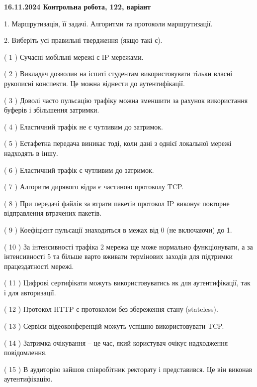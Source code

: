 \documentclass[12pt, ukrainian]{article}
\begin{document}
\vspace{4mm}
\newpage
\begin {large}

\textbf{16.11.2024 Контрольна робота, 122, варіант  }\par


{
1. Маршрутизація, її задачі. Алгоритми та протоколи маршрутизації.



\vspace{5mm}
2. Виберіть усі правильні твердження (якщо такі є).\par
\vspace{2mm}

( 1 ) Сучасні мобільні мережі є IP-мережами.

( 2 ) Викладач дозволив на іспиті студентам використовувати тільки власні рукописні конспекти. Це можна віднести до аутентифікації.

( 3 ) Доволі часто пульсацію трафіку можна зменшити за рахунок використання буферів і збільшення затримки.

( 4 ) Еластичний трафік не є чутливим до затримок.

( 5 ) Естафетна передача виникає тоді, коли дані з однієї локальної мережі надходять в іншу.

( 6 ) Еластичний трафік є чутливим до затримок.

( 7 ) Алгоритм дирявого відра є частиною протоколу TCP.

( 8 ) При передачі файлів за втрати пакетів протокол IP виконує повторне відправлення втрачених пакетів.

( 9 ) Коефіцієнт пульсації знаходиться в межах від 0 (не включаючи) до 1.

( 10 ) За інтенсивності трафіка 2 мережа ще може нормально функціонувати, а за інтенсивності 5 та більше варто вживати термінових заходів для підтримки працездатності мережі.

( 11 ) Цифрові сертифікати можуть використовуватись як для аутентифікації, так і для авторизації.

( 12 ) Протокол  HTTP є протоколом без збереження стану (stateless).

( 13 ) Сервіси відеоконференцій можуть успішно використовувати TCP.

( 14 ) Затримка очікування – це час, який користувач очікує надходження повідомлення.

( 15 ) В аудиторію зайшов співробітник ректорату і представився. Це він виконав аутентифікацію.
}
\end {large}
\end{document}
